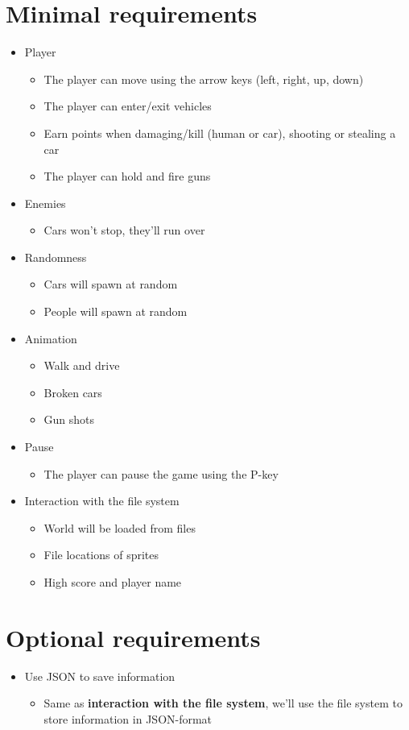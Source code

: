 \documentclass[12pt]{article}
\begin{document}
	\section{Minimal requirements}
	\begin{itemize}
		\item Player
			\begin{itemize}
				\item The player can move using the arrow keys (left, right, up, down)
				\item The player can enter/exit vehicles
				\item Earn points when damaging/kill (human or car), shooting or stealing a car
				\item The player can hold and fire guns
			\end{itemize}
		\item Enemies
			\begin{itemize}
				\item Cars won't stop, they'll run over
			\end{itemize}
		\item Randomness
			\begin{itemize}
				\item Cars will spawn at random
				\item People will spawn at random
			\end{itemize}
		\item Animation
			\begin{itemize}
				\item Walk and drive
				\item Broken cars
				\item Gun shots
			\end{itemize}
		\item Pause
			\begin{itemize}
				\item The player can pause the game using the P-key
			\end{itemize}
		\item Interaction with the file system
			\begin{itemize}
				\item World will be loaded from files
				\item File locations of sprites
				\item High score and player name
			\end{itemize}
	\end{itemize}

	\section{Optional requirements}
	\begin{itemize}
		\item Use JSON to save information
			\begin{itemize}
				\item Same as \textbf{interaction with the file system}, we'll use the file system to store information in JSON-format 
			\end{itemize}
	\end{itemize}
\end{document}
